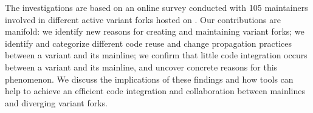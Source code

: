 The investigations are based on an online survey conducted with 105 maintainers involved in different active variant forks hosted on \gh.
%
Our contributions are manifold:
we identify new reasons for creating and maintaining variant forks;
we identify and categorize different code reuse and change propagation practices between a variant and its mainline;
we confirm that little code integration occurs between a variant and its mainline, and uncover concrete reasons for this phenomenon.
We discuss the implications of these findings and how tools can help to achieve an efficient code integration and collaboration between mainlines and diverging variant forks.



